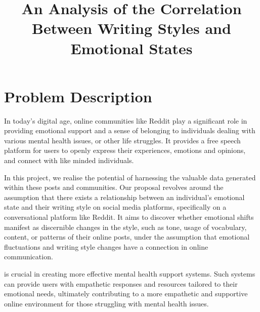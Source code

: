 \documentclass[conference,compsoc]{IEEEtran}
\begin{document}
\title{An Analysis of the Correlation Between Writing Styles and Emotional States}

\author{
\and
{}
}


\maketitle



\section{Problem Description}

In today's digital age, online communities like Reddit play a significant role in providing emotional support and a sense of belonging to individuals dealing with various mental health issues, or other life struggles. It provides a free speech platform for users to openly express their experiences, emotions and opinions, and connect with like minded individuals. 

In this project, we realise the potential of harnessing the valuable data generated within these posts and communities.  Our proposal revolves around the assumption that there exists a relationship between an individual's emotional state and their writing style on social media platforms, specifically on a conversational platform like Reddit. It aims to discover whether emotional shifts manifest as discernible changes in the style, such as tone, usage of vocabulary, content, or patterns of their online posts, under the assumption that emotional fluctuations and writing style changes have a connection in online communication. 

is crucial in creating more effective mental health support systems. Such systems can provide users with empathetic responses and resources tailored to their emotional needs, ultimately contributing to a more empathetic and supportive online environment for those struggling with mental health issues.
\end{document}

